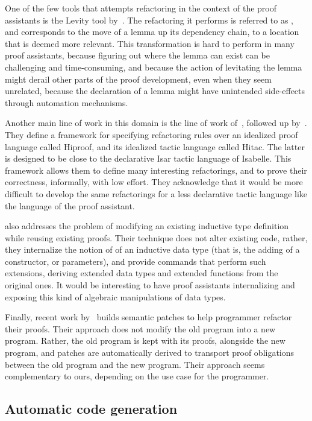 One of the few tools that attempts refactoring in the context of the proof
assistants is the Levity tool by~\citet{ruegenberg2011}.  The refactoring it
performs is referred to as , and corresponds to the move of a
lemma up its dependency chain, to a location that is deemed more relevant.  This
transformation is hard to perform in many proof assistants, because figuring out
where the lemma can exist can be challenging and time-consuming, and because the
action of levitating the lemma might derail other parts of the proof
development, even when they seem unrelated, because the declaration of a lemma
might have unintended side-effects through automation mechanisms.

Another main line of work in this domain is the line of work
of~\citet{whiteside2011}, followed up by~\citet{dietrich2013}.  They define a
framework for specifying refactoring rules over an idealized proof language
called Hiproof, and its idealized tactic language called Hitac.  The latter is
designed to be close to the declarative Isar tactic language of Isabelle.  This
framework allows them to define many interesting refactorings, and to prove
their correctness, informally, with low effort.  They acknowledge that it would
be more difficult to develop the same refactorings for a less declarative tactic
language like the \Ltac{} language of the \Coq{} proof assistant.

\citet{boite2004} also addresses the problem of modifying an existing inductive
type definition while reusing existing proofs.  Their technique does not alter
existing code, rather, they internalize the notion of  of an
inductive data type (that is, the adding of a constructor, or parameters), and
provide commands that perform such extensions, deriving extended data types and
extended functions from the original ones.  It would be interesting to have
proof assistants internalizing and exposing this kind of algebraic manipulations
of data types.

Finally, recent work by~\citet{ringer2018adapting} builds semantic patches to
help programmer refactor their proofs.  Their approach does not modify the old
program into a new program.  Rather, the old program is kept with its proofs,
alongside the new program, and patches are automatically derived to transport
proof obligations between the old program and the new program.  Their approach
seems complementary to ours, depending on the use case for the programmer.

\subsection*{Automatic code generation}

